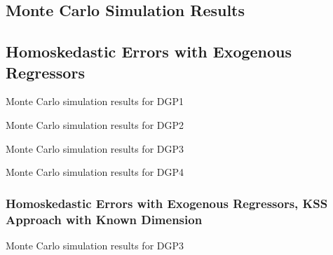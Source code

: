 \begin{appendix}
    \setcounter{table}{0}
\renewcommand{\thetable}{A\arabic{table}}

\section{Monte Carlo Simulation Results}\label{monte_carlo_appendix}
\thispagestyle{plainfancy}
\setlength\tabcolsep{3.4pt}

\subsection{Homoskedastic Errors with Exogenous Regressors}\label{homo_sim_results}
\begin{table}[b!]
\caption{Monte Carlo simulation results for \ac{DGP}1}\label{DGP1}
    \small
    \centering
 
\end{table}

\begin{table}[b]
\caption{Monte Carlo simulation results for \ac{DGP}2} \label{DGP2}
      \small
    \centering
 
\end{table}

\begin{table}[htb]
\caption{Monte Carlo simulation results for \ac{DGP}3}\label{DGP3}
      \small
    \centering
 
\end{table}

\begin{table}[htb]
\caption{Monte Carlo simulation results for \ac{DGP}4}\label{DGP4}
      \small
    \centering
 
\end{table}

\clearpage

\subsubsection{Homoskedastic Errors with Exogenous Regressors, \acs{KSS} Approach with Known Dimension}\label{exercise_sim}

\begin{table}[htb]
\caption{Monte Carlo simulation results for \ac{DGP}3}
     \small
    \centering
 
\end{table}

\clearpage


\end{appendix}
